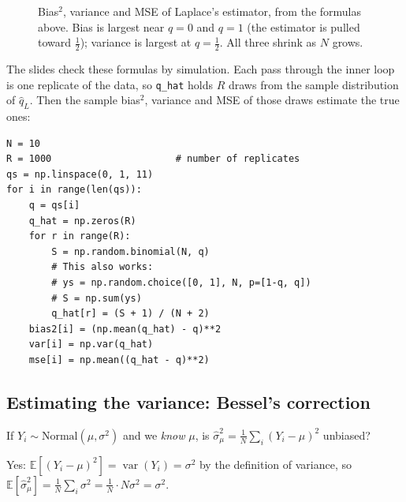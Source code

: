 \documentclass[11pt]{article}
\newcommand{\E}{\mathbb{E}}
\newcommand{\Var}{\operatorname{var}}
\newcommand{\Norm}{\text{Normal}}
\newcommand{\py}[1]{\texttt{#1}}
\begin{document}
\begin{figure}[h]
\centering
{}
\caption{Bias$^2$, variance and MSE of Laplace's estimator, from the formulas above. Bias is largest near $q=0$ and $q=1$ (the estimator
is pulled toward $\tfrac12$); variance is largest at $q=\tfrac12$. All three shrink as $N$ grows.}
\end{figure}

The slides check these formulas by simulation. Each pass through the inner loop is one replicate of the data, so \py{q\_hat} holds $R$
draws from the sample distribution of $\hat q_L$. Then the sample bias$^2$, variance and MSE of those draws estimate the true ones:
\begin{lstlisting}
N = 10
R = 1000                      # number of replicates
qs = np.linspace(0, 1, 11)
for i in range(len(qs)):
    q = qs[i]
    q_hat = np.zeros(R)
    for r in range(R):
        S = np.random.binomial(N, q)
        # This also works:
        # ys = np.random.choice([0, 1], N, p=[1-q, q])
        # S = np.sum(ys)
        q_hat[r] = (S + 1) / (N + 2)
    bias2[i] = (np.mean(q_hat) - q)**2
    var[i] = np.var(q_hat)
    mse[i] = np.mean((q_hat - q)**2)
\end{lstlisting}

\subsection{Estimating the variance: Bessel's correction}
\begin{examplebox}[title={Question (10/5): $\mu$ known}]
If $Y_i\sim\Norm(\mu,\sigma^2)$ and we \emph{know} $\mu$, is $\hat\sigma_\mu^2=\frac1N\sum_i(Y_i-\mu)^2$ unbiased?

Yes: $\E[(Y_i-\mu)^2]=\Var(Y_i)=\sigma^2$ by the definition of variance, so
$\E[\hat\sigma_\mu^2]=\frac1N\sum_i\sigma^2=\frac1N\cdot N\sigma^2=\sigma^2$.
\end{examplebox}
\end{document}
